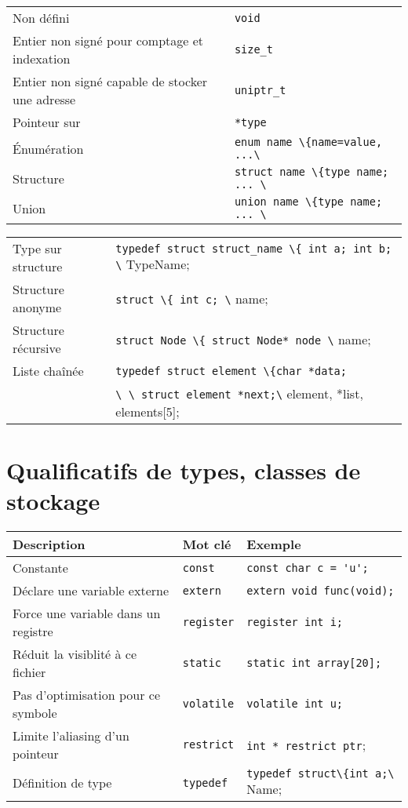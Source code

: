 \documentclass{article}
\newcommand{\cd}{\lstinline}
\begin{document}
\begin{multicols*}{3}
\begin{tabularx}{\linewidth}{Xl}
  Non défini                 & \cd{void} \\
  Entier non signé pour comptage et indexation & \cd{size_t} \\
  Entier non signé capable de stocker une adresse & \cd{uniptr_t} \\
  Pointeur sur                       & \cd{*type} \\
  Énumération                        & \cd{enum name \{name=value, ...\}}; \\
  Structure                          & \cd{struct name \{type name; ... \}}; \\
  Union                              & \cd{union name \{type name; ... \}}; \\
\end{tabularx}

\begin{tabularx}{\linewidth}{Xl}
  Type sur structure  & \cd{typedef struct struct_name \{ int a; int b; \} TypeName;} \\
  Structure anonyme   & \cd{struct \{ int c; \} name;} \\
  Structure récursive & \cd{struct Node \{ struct Node* node \} name;} \\
  Liste chaînée       & \cd{typedef struct element \{char *data;} \\
                      & \cd{\ \ struct element *next;\} element, *list, elements[5];}
\end{tabularx}

\section*{Qualificatifs de types, classes de stockage}

\begin{tabularx}{\linewidth}{X|l|l}
  \bf Description                     & \bf Mot clé & \bf Exemple \\
  \hline
  Constante                           & \cd{const}    & \cd{const char c = 'u';}\\
  Déclare une variable externe        & \cd{extern}   & \cd{extern void func(void);}\\
  Force une variable dans un registre & \cd{register} & \cd{register int i;}\\
  Réduit la visiblité à ce fichier    & \cd{static}   & \cd{static int array[20];}\\
  Pas d'optimisation pour ce symbole  & \cd{volatile} & \cd{volatile int u;}\\
  Limite l'aliasing d'un pointeur     & \cd{restrict} & \cd{int * restrict ptr};\\
  Définition de type                  & \cd{typedef} & \cd{typedef struct\{int a;\} Name;}\\
\end{tabularx}


\end{multicols*}
\end{document}
